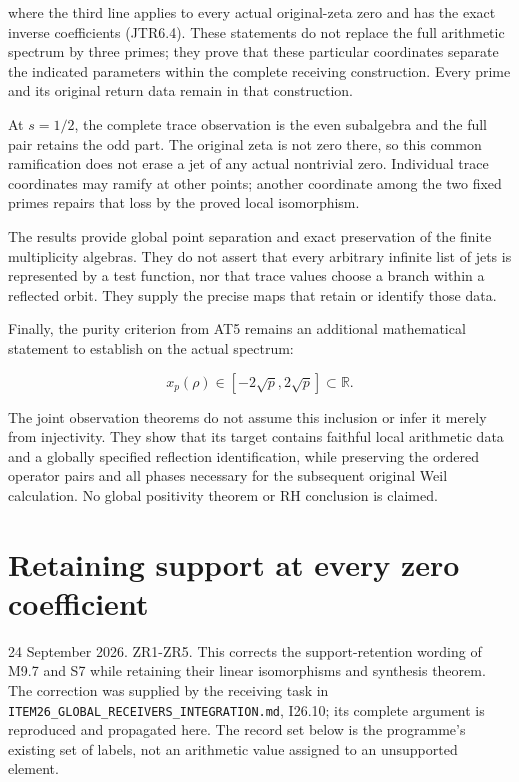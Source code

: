 \documentclass[
]{article}
\begin{document}
where the third line applies to every actual original-zeta zero and has
the exact inverse coefficients (JTR6.4). These statements do not replace
the full arithmetic spectrum by three primes; they prove that these
particular coordinates separate the indicated parameters within the
complete receiving construction. Every prime and its original return
data remain in that construction.

At \(s=1/2\), the complete trace observation is the even subalgebra and
the full pair retains the odd part. The original zeta is not zero there,
so this common ramification does not erase a jet of any actual
nontrivial zero. Individual trace coordinates may ramify at other
points; another coordinate among the two fixed primes repairs that loss
by the proved local isomorphism.

The results provide global point separation and exact preservation of
the finite multiplicity algebras. They do not assert that every
arbitrary infinite list of jets is represented by a test function, nor
that trace values choose a branch within a reflected orbit. They supply
the precise maps that retain or identify those data.

Finally, the purity criterion from AT5 remains an additional
mathematical statement to establish on the actual spectrum:

\[
x_p(\rho)\in[-2\sqrt p,2\sqrt p]\subset\mathbb R.
\]

The joint observation theorems do not assume this inclusion or infer it
merely from injectivity. They show that its target contains faithful
local arithmetic data and a globally specified reflection
identification, while preserving the ordered operator pairs and all
phases necessary for the subsequent original Weil calculation. No global
positivity theorem or RH conclusion is claimed.

\section{Retaining support at every zero
coefficient}\label{retaining-support-at-every-zero-coefficient}

24 September 2026. ZR1-ZR5. This corrects the support-retention wording
of M9.7 and S7 while retaining their linear isomorphisms and synthesis
theorem. The correction was supplied by the receiving task in
\nolinkurl{ITEM26_GLOBAL_RECEIVERS_INTEGRATION.md}, I26.10; its complete argument
is reproduced and propagated here. The record set below is the
programme's existing set of labels, not an arithmetic value assigned to
an unsupported element.
\end{document}

